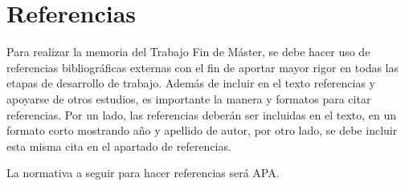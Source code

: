 
\section{Referencias}

Para realizar la memoria del Trabajo Fin de Máster, se debe hacer uso de referencias bibliográficas externas con el fin de aportar mayor rigor en todas las etapas de desarrollo de trabajo. Además de incluir en el texto referencias y apoyarse de otros estudios, es importante la manera y formatos para citar referencias. Por un lado, las referencias deberán ser incluidas en el texto, en un formato corto mostrando año y apellido de autor, por otro lado, se debe incluir esta misma cita en el apartado de referencias.

La normativa a seguir para hacer referencias será APA.

\begingroup
\renewcommand{\refname}{}
\setlength{\parskip}{0pt}


\endgroup
